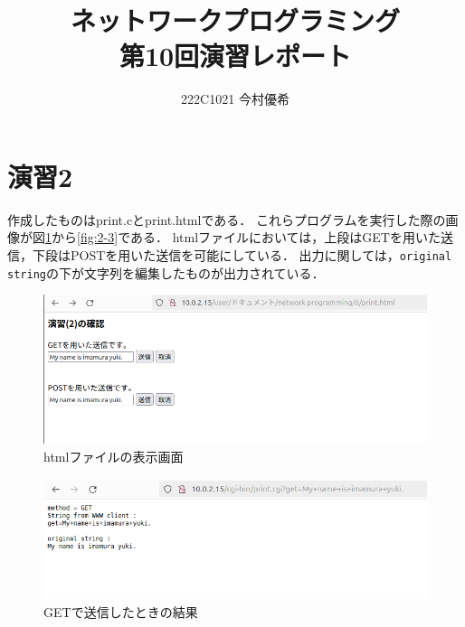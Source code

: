 \documentclass[documentclass]{jsarticle}
\begin{document}
\title{ネットワークプログラミング\\ 第10回演習レポート}
\author{222C1021 今村優希}
\maketitle

\newpage

\section*{演習2}
作成したものはprint.cとprint.htmlである．
これらプログラムを実行した際の画像が図\ref*{fig:2-1}から\ref*{fig:2-3}である．
htmlファイルにおいては，上段はGETを用いた送信，下段はPOSTを用いた送信を可能にしている．
出力に関しては，\texttt{original string}の下が文字列を編集したものが出力されている．




\begin{figure}[H]
  \begin{center}
    \includegraphics*[scale=0.8]{figure/2-0.png}
  \end{center}
  \caption[]{htmlファイルの表示画面}
  \label{fig:2-1}
\end{figure}

\begin{figure}[H]
  \begin{center}
    \includegraphics*[scale=0.8]{figure/2-1.png}
  \end{center}
  \caption[]{GETで送信したときの結果}
  \label{fig:2-2}
\end{figure}
\end{document}
